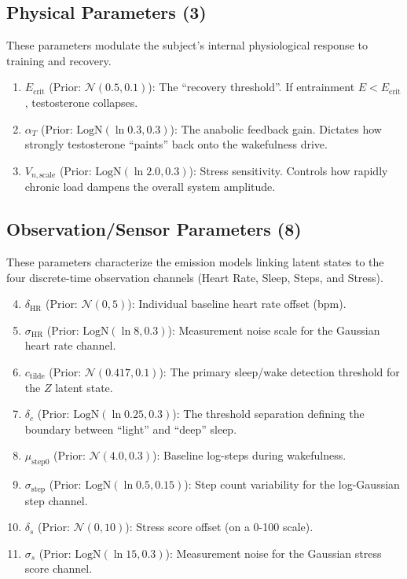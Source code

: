 \documentclass[11pt,a4paper]{article}
\begin{document}
\subsection{Physical Parameters (3)}
These parameters modulate the subject's internal physiological response to training and recovery.
\begin{enumerate}
    \item $E_{\text{crit}}$ (Prior: $\mathcal{N}(0.5, 0.1)$): The ``recovery threshold''. If entrainment $E < E_{\text{crit}}$, testosterone collapses.
    \item $\alpha_T$ (Prior: $\text{LogN}(\ln 0.3, 0.3)$): The anabolic feedback gain. Dictates how strongly testosterone ``paints'' back onto the wakefulness drive.
    \item $V_{n,\text{scale}}$ (Prior: $\text{LogN}(\ln 2.0, 0.3)$): Stress sensitivity. Controls how rapidly chronic load dampens the overall system amplitude.
\end{enumerate}

\subsection{Observation/Sensor Parameters (8)}
These parameters characterize the emission models linking latent states to the four discrete-time observation channels (Heart Rate, Sleep, Steps, and Stress).
\begin{enumerate}
\setcounter{enumi}{3}
    \item $\delta_{\text{HR}}$ (Prior: $\mathcal{N}(0, 5)$): Individual baseline heart rate offset (bpm).
    \item $\sigma_{\text{HR}}$ (Prior: $\text{LogN}(\ln 8, 0.3)$): Measurement noise scale for the Gaussian heart rate channel.
    \item $c_{\text{tilde}}$ (Prior: $\mathcal{N}(0.417, 0.1)$): The primary sleep/wake detection threshold for the $Z$ latent state.
    \item $\delta_c$ (Prior: $\text{LogN}(\ln 0.25, 0.3)$): The threshold separation defining the boundary between ``light'' and ``deep'' sleep.
    \item $\mu_{\text{step}0}$ (Prior: $\mathcal{N}(4.0, 0.3)$): Baseline log-steps during wakefulness.
    \item $\sigma_{\text{step}}$ (Prior: $\text{LogN}(\ln 0.5, 0.15)$): Step count variability for the log-Gaussian step channel.
    \item $\delta_s$ (Prior: $\mathcal{N}(0, 10)$): Stress score offset (on a 0-100 scale).
    \item $\sigma_s$ (Prior: $\text{LogN}(\ln 15, 0.3)$): Measurement noise for the Gaussian stress score channel.
\end{enumerate}
\end{document}
